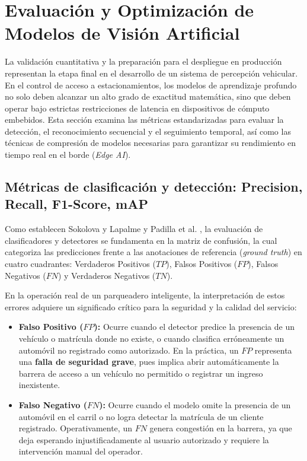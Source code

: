 \section{Evaluación y Optimización de Modelos de Visión Artificial}

La validación cuantitativa y la preparación para el despliegue en producción
representan la etapa final en el desarrollo de un sistema de percepción
vehicular. En el control de acceso a estacionamientos, los modelos de aprendizaje
profundo no solo deben alcanzar un alto grado de exactitud matemática, sino que
deben operar bajo estrictas restricciones de latencia en dispositivos de cómputo
embebidos. Esta sección examina las métricas estandarizadas para evaluar la
detección, el reconocimiento secuencial y el seguimiento temporal, así como las
técnicas de compresión de modelos necesarias para garantizar su rendimiento en
tiempo real en el borde (\textit{Edge AI}).

\subsection{Métricas de clasificación y detección: Precision, Recall, F1-Score,
mAP}

Como establecen Sokolova y Lapalme \cite{sokolova2009performance} y Padilla et
al. \cite{padilla2021metrics}, la evaluación de clasificadores y detectores se
fundamenta en la matriz de confusión, la cual categoriza las predicciones frente
a las anotaciones de referencia (\textit{ground truth}) en cuatro cuadrantes:
Verdaderos Positivos ($TP$), Falsos Positivos ($FP$), Falsos Negativos ($FN$) y
Verdaderos Negativos ($TN$). 

En la operación real de un parqueadero inteligente, la interpretación de estos
errores adquiere un significado crítico para la seguridad y la calidad del
servicio:
\begin{itemize}
    \item \textbf{Falso Positivo ($FP$):} Ocurre cuando el detector predice la
        presencia de un vehículo o matrícula donde no existe, o cuando clasifica
        erróneamente un automóvil no registrado como autorizado. En la práctica,
        un $FP$ representa una \textbf{falla de seguridad grave}, pues implica
        abrir automáticamente la barrera de acceso a un vehículo no permitido o
        registrar un ingreso inexistente.
        
    \item \textbf{Falso Negativo ($FN$):} Ocurre cuando el modelo omite la
        presencia de un automóvil en el carril o no logra detectar la matrícula
        de un cliente registrado. Operativamente, un $FN$ genera congestión en
        la barrera, ya que deja esperando injustificadamente al usuario
        autorizado y requiere la intervención manual del operador.
\end{itemize}


